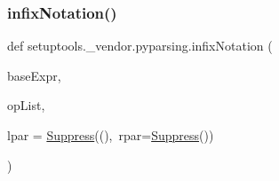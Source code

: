  \mbox{\label{namespacesetuptools_1_1__vendor_1_1pyparsing_a929a2b2bcc0fb4b63624e72f021cc266}} 
\subsubsection{\texorpdfstring{infix\+Notation()}{infixNotation()}}
{\footnotesize\ttfamily def setuptools.\+\_\+vendor.\+pyparsing.\+infix\+Notation (\begin{DoxyParamCaption}\item[{}]{base\+Expr,  }\item[{}]{op\+List,  }\item[{}]{lpar = {\ttfamily \hyperlink{classsetuptools_1_1__vendor_1_1pyparsing_1_1_suppress}{Suppress}(\textquotesingle{}(\textquotesingle{}),~rpar=\hyperlink{classsetuptools_1_1__vendor_1_1pyparsing_1_1_suppress}{Suppress}(\textquotesingle{})\textquotesingle{})} }\end{DoxyParamCaption})}

